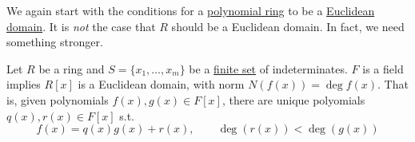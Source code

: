   \begin{example}[]
    \label{ex:polynomial-euclidean-domains}
    
  \end{example}

  We again start with the conditions for a \hyperref[def:polynomial-ring]{polynomial ring} to be a \hyperref[def:euclidean-domain]{Euclidean domain}. It is \textit{not} the case that $R$ should be a Euclidean domain. In fact, we need something stronger. 

  \begin{theorem}
    \label{thm:conditions-for-rlbrackxrbrack-to-be-euclidean}
    Let $R$ be a ring and $S = \{x_1, \ldots, x_m\}$ be a \hyperref[st-def:finite-set]{finite set} of indeterminates. $F$ is a field implies $R[x]$ is a Euclidean domain, with norm $N(f(x)) = \deg{f(x)}$. That is, given polynomials $f(x), g(x) \in F[x]$, there are unique polyomials $q(x), r(x) \in F[x]$ s.t. 
    \begin{equation}
      f(x) = q(x) g(x) + r(x), \qquad \deg(r(x)) < \deg(g(x))
    \end{equation} 
  \end{theorem}
